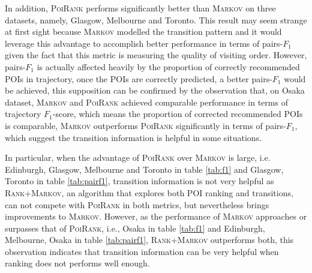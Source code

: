 In addition, \textsc{PoiRank} performs significantly better than \textsc{Markov} on three datasets, namely,
Glasgow, Melbourne and Toronto.
%
This result may seem strange at first sight because \textsc{Markov} modelled the transition pattern and it would leverage
this advantage to accomplish better performance in terms of pairs-$F_1$ given the fact that this metric is measuring the quality
of visiting order.
However, pairs-$F_1$ is actually affected heavily by the proportion of correctly recommended POIs in trajectory,
once the POIs are correctly predicted, a better pairs-$F_1$ would be achieved,
this supposition can be confirmed by the observation that, on Osaka dataset, \textsc{Markov} and \textsc{PoiRank} achieved
comparable performance in terms of trajectory $F_1$-score, which means the proportion of corrected recommended POIs is comparable,
\textsc{Markov} outperforms \textsc{PoiRank} significantly in terms of pairs-$F_1$,
which suggest the transition information is helpful in some situations.

In particular, when the advantage of \textsc{PoiRank} over \textsc{Markov} is large,
i.e. Edinburgh, Glasgow, Melbourne and Toronto in table \ref{tab:f1} and Glasgow, Toronto in table \ref{tab:pairf1},
transition information is not very helpful as \textsc{Rank+Markov}, an algorithm that explores both POI ranking and transitions,
can not compete with \textsc{PoiRank} in both metrics, but nevertheless brings improvements to \textsc{Markov}.
However, as the performance of \textsc{Markov} approaches or surpasses that of \textsc{PoiRank},
i.e., Osaka in table \ref{tab:f1} and Edinburgh, Melbourne, Osaka in table \ref{tab:pairf1},
\textsc{Rank+Markov} outperforms both, this observation indicates that transition information can be very helpful when
ranking does not performs well enough.


